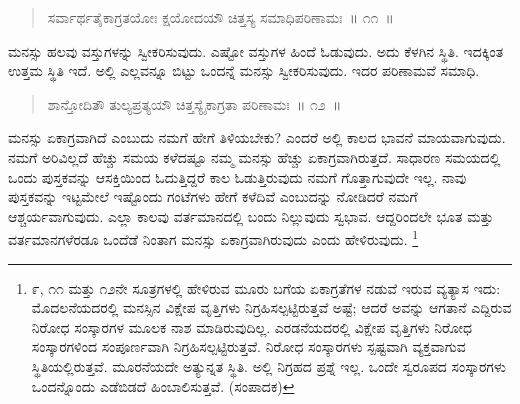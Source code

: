 \vspace{-0.2cm}

\begin{verse}
ಸರ್ವಾರ್ಥತೈಕಾಗ್ರತಯೋಃ ಕ್ಷಯೋದಯೌ ಚಿತ್ತಸ್ಯ ಸಮಾಧಿಪರಿಣಾಮಃ~॥ ೧೧~॥
\end{verse}

\vspace{-0.42cm}


\vspace{0.1cm}

ಮನಸ್ಸು ಹಲವು ವಸ್ತುಗಳನ್ನು ಸ್ವೀಕರಿಸುವುದು. ಎಷ್ಟೋ ವಸ್ತುಗಳ ಹಿಂದೆ ಓಡುವುದು. ಅದು ಕೆಳಗಿನ ಸ್ಥಿತಿ. ಇದಕ್ಕಿಂತ ಉತ್ತಮ ಸ್ಥಿತಿ ಇದೆ. ಅಲ್ಲಿ ಎಲ್ಲವನ್ನೂ ಬಿಟ್ಟು ಒಂದನ್ನೆ ಮನಸ್ಸು ಸ್ವೀಕರಿಸುವುದು. ಇದರ ಪರಿಣಾಮವೆ ಸಮಾಧಿ. 

\vspace{-0.2cm}

\begin{verse}
ಶಾನ್ತೋದಿತೌ ತುಲ್ಯಪ್ರತ್ಯಯೌ ಚಿತ್ತಸ್ಯೈಕಾಗ್ರತಾ ಪರಿಣಾಮಃ~॥ ೧೨~॥
\end{verse}

\vspace{-0.42cm}


\vspace{0.2cm}

ಮನಸ್ಸು ಏಕಾಗ್ರವಾಗಿದೆ ಎಂಬುದು ನಮಗೆ ಹೇಗೆ ತಿಳಿಯಬೇಕು? ಎಂದರೆ ಅಲ್ಲಿ ಕಾಲದ ಭಾವನೆ ಮಾಯವಾಗುವುದು. ನಮಗೆ ಅರಿವಿಲ್ಲದೆ ಹೆಚ್ಚು ಸಮಯ ಕಳೆದಷ್ಟೂ ನಮ್ಮ ಮನಸ್ಸು ಹೆಚ್ಚು ಏಕಾಗ್ರವಾಗಿರುತ್ತದೆ. ಸಾಧಾರಣ ಸಮಯದಲ್ಲಿ ಒಂದು ಪುಸ್ತಕವನ್ನು ಆಸಕ್ತಿಯಿಂದ ಓದುತ್ತಿದ್ದರೆ ಕಾಲ ಓಡುತ್ತಿರುವುದು ನಮಗೆ ಗೊತ್ತಾಗುವುದೇ ಇಲ್ಲ. ನಾವು ಪುಸ್ತಕವನ್ನು ಇಟ್ಟಮೇಲೆ ಇಷ್ಟೊಂದು ಗಂಟೆಗಳು ಹೇಗೆ ಕಳೆದಿವೆ ಎಂಬುದನ್ನು ನೋಡಿದರೆ ನಮಗೆ ಆಶ್ಚರ್ಯವಾಗುವುದು. ಎಲ್ಲಾ ಕಾಲವು ವರ್ತಮಾನದಲ್ಲಿ ಬಂದು ನಿಲ್ಲುವುದು ಸ್ವಭಾವ. ಆದ್ದರಿಂದಲೇ ಭೂತ ಮತ್ತು ವರ್ತಮಾನಗಳೆರಡೂ ಒಂದೆಡೆ ನಿಂತಾಗ ಮನಸ್ಸು ಏಕಾಗ್ರವಾಗಿರುವುದು ಎಂದು ಹೇಳಿರುವುದು. \footnote{೯, ೧೧ ಮತ್ತು ೧೨ನೇ ಸೂತ್ರಗಳಲ್ಲಿ ಹೇಳಿರುವ ಮೂರು ಬಗೆಯ ಏಕಾಗ್ರತೆಗಳ ನಡುವೆ ಇರುವ ವ್ಯತ್ಯಾಸ ಇದು: ಮೊದಲನೆಯದರಲ್ಲಿ ಮನಸ್ಸಿನ ವಿಕ್ಷೇಪ ವೃತ್ತಿಗಳು ನಿಗ್ರಹಿಸಲ್ಪಟ್ಟಿರುತ್ತವೆ ಅಷ್ಟೆ; ಆದರೆ ಅವನ್ನು ಆಗತಾನೆ ಎದ್ದಿರುವ ನಿರೋಧ ಸಂಸ್ಕಾರಗಳ ಮೂಲಕ ನಾಶ ಮಾಡಿರುವುದಿಲ್ಲ. ಎರಡನೆಯದರಲ್ಲಿ ವಿಕ್ಷೇಪ ವೃತ್ತಿಗಳು ನಿರೋಧ ಸಂಸ್ಕಾರಗಳಿಂದ ಸಂಪೂರ್ಣವಾಗಿ ನಿಗ್ರಹಿಸಲ್ಪಟ್ಟಿರುತ್ತವೆ. ನಿರೋಧ ಸಂಸ್ಕಾರಗಳು ಸ್ಪಷ್ಟವಾಗಿ ವ್ಯಕ್ತವಾಗುವ ಸ್ಥಿತಿಯಲ್ಲಿರುತ್ತವೆ. ಮೂರನೆಯದೇ ಅತ್ಯುನ್ನತ ಸ್ಥಿತಿ. ಅಲ್ಲಿ ನಿಗ್ರಹದ ಪ್ರಶ್ನೆ ಇಲ್ಲ. ಒಂದೇ ಸ್ವರೂಪದ ಸಂಸ್ಕಾರಗಳು ಒಂದನ್ನೊಂದು ಎಡೆಬಿಡದೆ ಹಿಂಬಾಲಿಸುತ್ತವೆ. (ಸಂಪಾದಕ)}

\vspace{-0.3cm}

